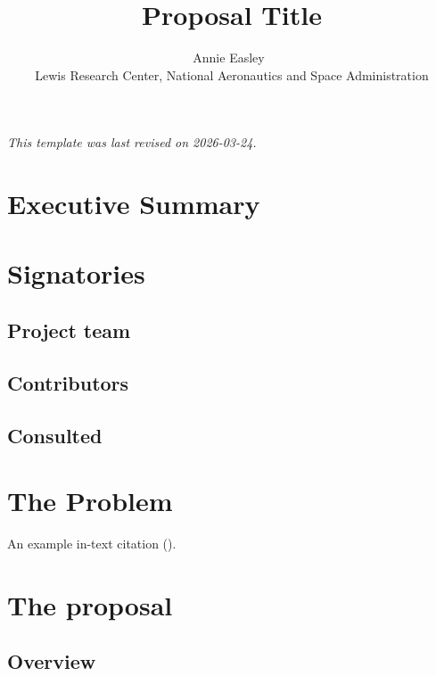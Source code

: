 \documentclass[
]{article}
\title{Proposal Title}
\author{
{\large Annie Easley~\orcidlink{5555-5555-5555-5555}}%
 \\%
Lewis Research Center, National Aeronautics and Space Administration \\%
{\footnotesize \url{}} \and
}
\date{}
\newcommand{\published}[1]{%
   \gdef\puB{#1}}
\newcommand{\puB}{}
\begin{document}
\published{\textbf{2026-10-01}}

\maketitle






\emph{This template was last revised on 2026-03-24.}

\section{Executive Summary}\label{executive-summary}

\section{Signatories}\label{signatories}

\subsection{Project team}\label{project-team}

\subsection{Contributors}\label{contributors}

\subsection{Consulted}\label{consulted}

\section{The Problem}\label{the-problem}

An example in-text citation ().

\section{The proposal}\label{the-proposal}

\subsection{Overview}\label{overview}
\end{document}
